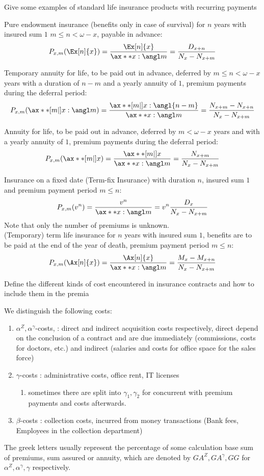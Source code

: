 \documentclass[11pt,a4paper,twoside]{article}
\begin{document}
Give some examples of standard life insurance products with recurring payments

Pure endowment insurance (benefits only in case of survival) for \( n \) years with insured sum \( 1 \)
\( m \leq n < \omega - x \), payable in advance:
\[ P_{x,m}(\Ex[n]{x}) = \frac{\Ex[n]{x}}{\ax**{x:\angl m}} = \frac{D_{x+n}}{N_x - N_{x+m}} \]

Temporary annuity for life, to be paid out in advance, deferred by \( m \leq n < \omega - x \) years
with a duration of \( n - m \) and a yearly annuity of \( 1 \), premium payments during the deferral period:
\[ P_{x,m}(\ax**[m|]{x:\angl m}) = \frac{\ax**[m|]{x:\angl{n - m}}}{\ax**{x:\angl m}} = \frac{N_{x+m} - N_{x+n}}{N_x - N_{x+m}}  \]

Annuity for life, to be paid out in advance, deferred by \( m < \omega - x \) years and with a yearly
annuity of \( 1 \), premium payments during the deferral period:
\[ P_{x,m}(\ax**[m|]{x}) = \frac{\ax**[m|]{x}}{\ax**{x:\angl m}} = \frac{N_{x+m}}{N_x - N_{x+m}}  \]

Insurance on a fixed date (Term-fix Insurance) with duration \( n \), insured sum \( 1 \) and
premium payment period \( m \leq n \):
\[ P_{x,m}(v^n) = \frac{v^n}{\ax**{x:\angl m}} = v^n \frac{D_x}{N_x - N_{x+m}} \]
Note that only the number of premiums is unknown. \\

(Temporary) term life insurance for \( n \) years with insured sum \( 1 \), benefits are to be paid
at the end of the year of death, premium payment period \( m \leq n \):
\[ P_{x,m}(\Ax[n]{x}) = \frac{\Ax[n]{x}}{\ax**{x: \angl m}} = \frac{M_x - M_{x+n}}{N_x - N_{x+m}} \]



Define the different kinds of cost encountered in insurance contracts and how to include them in the premia

We distinguish the following costs:
\begin{enumerate}
  \item \( \alpha^Z, \alpha^\gamma \)-costs, : direct and indirect acquisition costs respectively, direct depend on the conclusion of a contract and are due immediately (commissions, costs for doctors, etc.) and indirect (salaries and costs for office space for the sales force)
  \item \( \gamma \)-costs : administrative costs, office rent, IT licenses
  \begin{enumerate}
    \item sometimes there are split into \( \gamma_1, \gamma_2 \) for concurrent with premium payments and costs afterwards.
  \end{enumerate}
\item \( \beta \)-costs : collection costs, incurred from money transactions (Bank fees, Employees in the collection department)
\end{enumerate}
The greek letters usually represent the percentage of some calculation base sum of premiums, sum assured or annuity,
which are denoted by \( GA^Z, GA^\gamma, GG \) for \( \alpha^Z, \alpha^\gamma, \gamma \) respectively. \\
\end{document}
